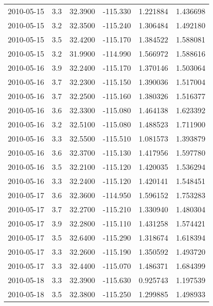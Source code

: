 \begin{tabular}{lrrrrr}
2010-05-15 &       3.3 &  32.3900 &  -115.330 &         1.221884 &         1.436698 \\
2010-05-15 &       3.2 &  32.3500 &  -115.240 &         1.306484 &         1.492180 \\
2010-05-15 &       3.5 &  32.4200 &  -115.170 &         1.384522 &         1.588081 \\
2010-05-15 &       3.2 &  31.9900 &  -114.990 &         1.566972 &         1.588616 \\
2010-05-16 &       3.9 &  32.2400 &  -115.170 &         1.370146 &         1.503064 \\
2010-05-16 &       3.7 &  32.2300 &  -115.150 &         1.390036 &         1.517004 \\
2010-05-16 &       3.7 &  32.2500 &  -115.160 &         1.380326 &         1.516377 \\
2010-05-16 &       3.6 &  32.3300 &  -115.080 &         1.464138 &         1.623392 \\
2010-05-16 &       3.2 &  32.5100 &  -115.080 &         1.488523 &         1.711900 \\
2010-05-16 &       3.3 &  32.5500 &  -115.510 &         1.081573 &         1.393879 \\
2010-05-16 &       3.6 &  32.3700 &  -115.130 &         1.417956 &         1.597780 \\
2010-05-16 &       3.5 &  32.2100 &  -115.120 &         1.420035 &         1.536294 \\
2010-05-16 &       3.3 &  32.2400 &  -115.120 &         1.420141 &         1.548451 \\
2010-05-17 &       3.6 &  32.3600 &  -114.950 &         1.596152 &         1.753283 \\
2010-05-17 &       3.7 &  32.2700 &  -115.210 &         1.330940 &         1.480304 \\
2010-05-17 &       3.9 &  32.2800 &  -115.110 &         1.431258 &         1.574421 \\
2010-05-17 &       3.5 &  32.6400 &  -115.290 &         1.318674 &         1.618394 \\
2010-05-17 &       3.3 &  32.2600 &  -115.190 &         1.350592 &         1.493720 \\
2010-05-17 &       3.3 &  32.4400 &  -115.070 &         1.486371 &         1.684399 \\
2010-05-18 &       3.3 &  32.3900 &  -115.630 &         0.925743 &         1.197539 \\
2010-05-18 &       3.5 &  32.3800 &  -115.250 &         1.299885 &         1.498933 \\

\end{tabular}
